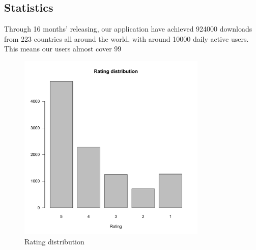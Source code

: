 \subsection{Statistics}
Through 16 months' releasing, our application have achieved 924000 downloads from 223 countries all around the world, with around 10000 daily active users. This means our users almost cover 99%

\begin{figure}[htb]
\centering \includegraphics[height=9cm]{charts/rating_distribution}
\caption{Rating distribution\label{ratings}}
\end{figure}

